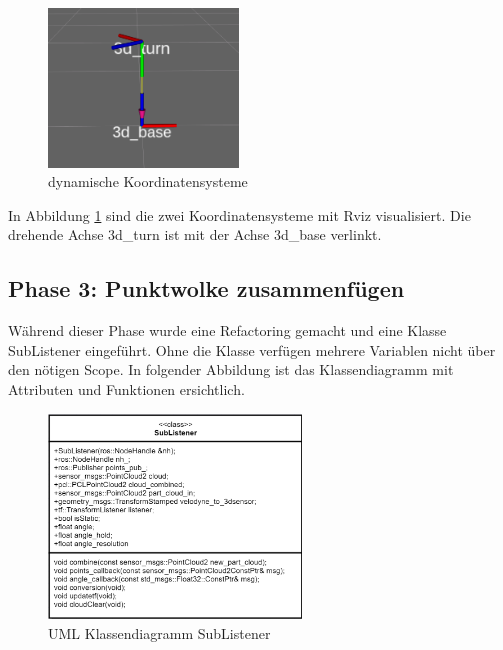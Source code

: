 \begin{figure}[H]
	\centering
	\includegraphics[width=0.45\textwidth]{resources/tf_rotation.PNG}
	\caption[dynamische Koordinatentransformation]{dynamische Koordinatensysteme}
	\label{fig:koordinaten}
\end{figure} 

In Abbildung \ref{fig:koordinaten} sind die zwei Koordinatensysteme mit Rviz visualisiert. Die drehende Achse 3d\_turn ist mit der Achse 3d\_base verlinkt.

\subsection{Phase 3: Punktwolke zusammenfügen}
\label{subsec:Phase3}
Während dieser Phase wurde eine \ac{Refactoring} gemacht und eine Klasse SubListener eingeführt. Ohne die Klasse verfügen mehrere Variablen nicht über den nötigen \ac{Scope}. In folgender Abbildung ist das Klassendiagramm mit Attributen und Funktionen ersichtlich.

\begin{figure}[H]
	\centering
	\includegraphics[width=0.6\textwidth]{resources/classdiagram.PNG}
	\caption[UML Klassendiagramm SubListener]{UML Klassendiagramm SubListener}
	\label{fig:classSubListener}
\end{figure} 

